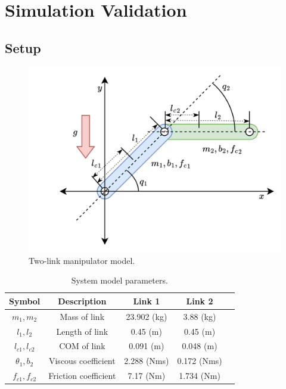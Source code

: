 \section{Simulation Validation}

\subsection{Setup}

\begin{figure}[!t]
    \centering
    \includegraphics[width=0.75\linewidth]{imgs/RobotModel.drawio.png}
    \caption{Two-link manipulator model.}
    \label{chap3:fig:plant}
\end{figure}

\begin{table}[!t]
    \renewcommand{\arraystretch}{1.3}
    \caption{System model parameters.}
    \centering
    \begin{tabular}{|c||c|c|c|c|}
    \hline
    Symbol & \textbf{Description} & \textbf{Link 1} & \textbf{Link 2} \\
    \hline 
    $m_1, m_2$ & Mass of link    & 23.902 (kg) & 3.88 (kg) \\
    \hline
    $l_1, l_2$  & Length of link   & 0.45 (m) & 0.45 (m) \\
    \hline
    $l_{c1}, l_{c2}$ & COM of link  & 0.091 (m) & 0.048 (m) \\
    \hline
    $\theta_1, b_2$   & Viscous coefficient  &  2.288 (Nms) & 0.172 (Nms) \\
    \hline
    $f_{c1}, f_{c2}$  & Friction coefficient &  7.17 (Nm) & 1.734 (Nm) \\
    \hline
    \end{tabular}
    \label{chap3:table:plant_param}
\end{table}

